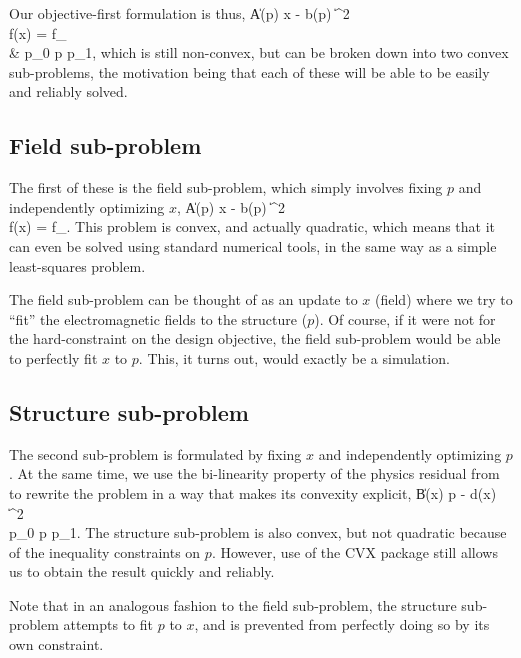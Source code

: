 Our objective-first formulation is thus,
\BA {} \| A(p) x - b(p) \|^2 \notag \\
    \subto f(x) = f_ \label{eq:ob1} \\
        & p_0 \le p \le p_1, \notag \EA
    which is still non-convex, but can be broken down into 
    two convex sub-problems, 
    the motivation being that each of these will be 
    able to be easily and reliably solved.

\subsection{Field sub-problem}
The first of these is the field sub-problem, 
    which simply involves fixing $p$ and independently optimizing $x$,
\BA {} \| A(p) x - b(p) \|^2 \label{eq:Fsub} \\
    \subto f(x) = f_. \notag \EA
This problem is convex, and actually quadratic,
    which means that it can even be solved 
    using standard numerical tools, in the same way 
    as a simple least-squares problem.

The field sub-problem can be thought of as an update to $x$ (field)
    where we try to ``fit'' the electromagnetic fields to the structure ($p$).
Of course, if it were not for the hard-constraint on the design objective,
    the field sub-problem would be able to perfectly fit $x$ to $p$.
This, it turns out, would exactly be a simulation.

\subsection{Structure sub-problem}
The second sub-problem is formulated by fixing $x$ and
    independently optimizing $p$.
At the same time, we use the bi-linearity property
    of the physics residual from 
    to rewrite the problem in a way that makes
    its convexity explicit,
\BA {} \| B(x) p - d(x) \|^2 \label{eq:Ssub} \\
    \subto p_0 \le p \le p_1. \notag \EA
The structure sub-problem is also convex, but not quadratic because of the 
    inequality constraints on $p$.
However, use of the CVX package still allows us to obtain the result
    quickly and reliably.

Note that in an analogous fashion to the field sub-problem,
    the structure sub-problem attempts to fit $p$ to $x$,
    and is prevented from perfectly doing so by its own constraint.

